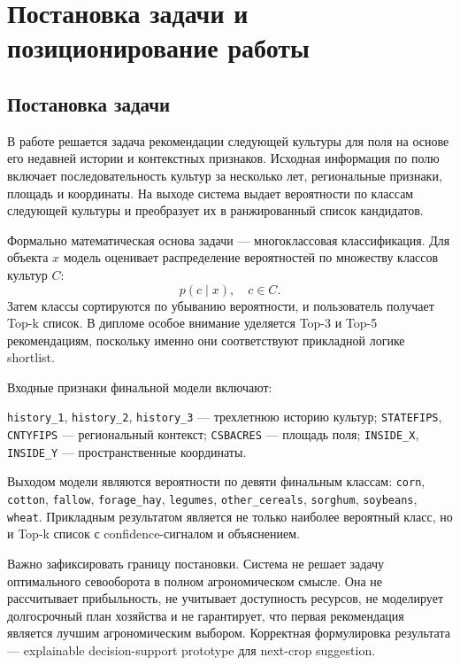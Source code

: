 \documentclass[a4paper,article,14pt]{extarticle}
\begin{document}
\section{Постановка задачи и позиционирование работы}

\subsection{Постановка задачи}

В работе решается задача рекомендации следующей культуры для поля на основе его недавней истории и контекстных признаков. Исходная информация по полю включает последовательность культур за несколько лет, региональные признаки, площадь и координаты. На выходе система выдает вероятности по классам следующей культуры и преобразует их в ранжированный список кандидатов.

Формально математическая основа задачи --- многоклассовая классификация. Для объекта $x$ модель оценивает распределение вероятностей по множеству классов культур $C$:
\begin{equation}
    p(c \mid x), \quad c \in C.
\end{equation}
Затем классы сортируются по убыванию вероятности, и пользователь получает Top-k список. В дипломе особое внимание уделяется Top-3 и Top-5 рекомендациям, поскольку именно они соответствуют прикладной логике shortlist.

Входные признаки финальной модели включают:
\begin{itemize}
    \ITEM \texttt{history\_1}, \texttt{history\_2}, \texttt{history\_3} --- трехлетнюю историю культур;
    \ITEM \texttt{STATEFIPS}, \texttt{CNTYFIPS} --- региональный контекст;
    \ITEM \texttt{CSBACRES} --- площадь поля;
    \ITEM \texttt{INSIDE\_X}, \texttt{INSIDE\_Y} --- пространственные координаты.
\end{itemize}

Выходом модели являются вероятности по девяти финальным классам: \texttt{corn}, \texttt{cotton}, \texttt{fallow}, \texttt{forage\_hay}, \texttt{legumes}, \texttt{other\_cereals}, \texttt{sorghum}, \texttt{soybeans}, \texttt{wheat}. Прикладным результатом является не только наиболее вероятный класс, но и Top-k список с confidence-сигналом и объяснением.

Важно зафиксировать границу постановки. Система не решает задачу оптимального севооборота в полном агрономическом смысле. Она не рассчитывает прибыльность, не учитывает доступность ресурсов, не моделирует долгосрочный план хозяйства и не гарантирует, что первая рекомендация является лучшим агрономическим выбором. Корректная формулировка результата --- explainable decision-support prototype для next-crop suggestion.
\end{document}
